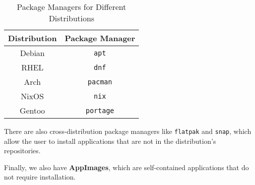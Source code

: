 \begin{table}
    \centering
    \begin{tabular}{c c}
        \hline
        \textbf{Distribution} & \textbf{Package Manager} \\
        \hline
        Debian & \lstinline|apt| \\
        RHEL & \lstinline|dnf| \\
        Arch & \lstinline|pacman| \\
        NixOS & \lstinline|nix| \\
        Gentoo & \lstinline|portage| \\
        \hline
    \end{tabular}
    \caption{Package Managers for Different Distributions}
\end{table}

There are also cross-distribution package managers like \lstinline|flatpak| and \lstinline|snap|,
which allow the user to install applications that are not in the distribution's repositories.

Finally, we also have \textbf{AppImages}, which are self-contained applications that do not require installation.
